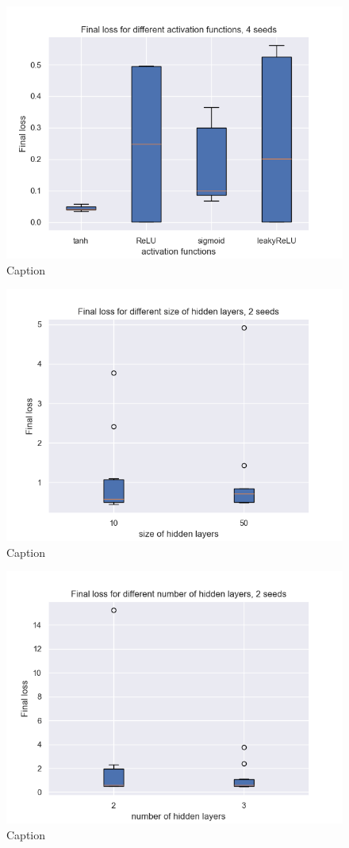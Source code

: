 \begin{figure}
    \centering
    \includegraphics[width=1.0\linewidth]{project_3/plots/activation_search.png}
    \caption{Caption}
    \label{fig:enter-label}
\end{figure}

\begin{figure}
    \centering
    \includegraphics[width=1.0\linewidth]{project_3/plots/value_layers_search.png}
    \caption{Caption}
    \label{fig:enter-label}
\end{figure}

\begin{figure}
    \centering
    \includegraphics[width=1.0\linewidth]{project_3/plots/n_layers_search.png}
    \caption{Caption}
    \label{fig:enter-label}
\end{figure}

